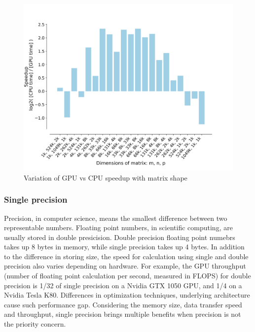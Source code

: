 \documentclass[9pt,twocolumn,twoside,lineno]{gsag3jnl}
\begin{document}
\begin{figure}[!htb]
	\centering
	\caption{Variation of GPU vs CPU speedup with matrix shape
	}
	\label{GPUCPUShape}
	\includegraphics[scale = 0.36]{figs/speedup.png}
\end{figure} 

 
\subsubsection{Single precision}
Precision, in computer science, means the smallest difference between two representable numbers.
Floating point numbers, in scientific computing, are usually stored in double presicision. 
Double precision floating point numebrs takes up 8 bytes in memory, while single precision takes up 4 bytes. 
In addition to the difference in storing size, the speed for calculation using single and double precision also varies depending on hardware. 
For example, the GPU throughput (number of floating point calculation per second, measured in FLOPS) for double precision is 1/32 of single precision on a Nvidia GTX 1050 GPU, and 1/4 on a Nvidia Tesla K80. 
Differences in optimization techniques, underlying architecture cause such performance gap. 
Considering the memory size, data transfer speed and throughput, single precision brings multiple benefits when precision is not the priority concern. 
\end{document}
